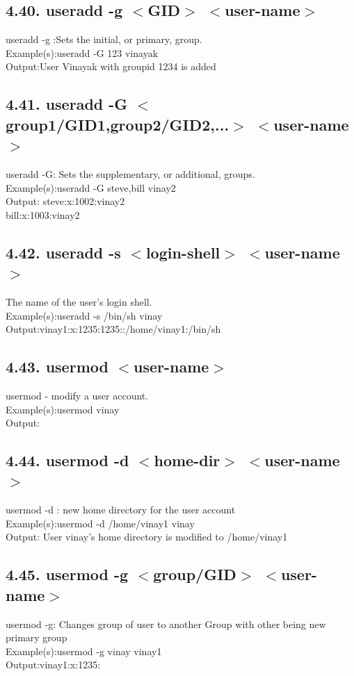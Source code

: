 \documentclass[11pt,a4]{article}
\begin{document}
\begin{enumerate}
\subsection*{4.40. useradd -g $<$GID$>$ $<$user-name$>$}
 useradd -g :Sets the initial, or primary, group.\\
 Example(s):useradd -G 123 vinayak\\
 Output:User Vinayak with groupid 1234 is added
\subsection*{4.41. useradd -G $<$group1/GID1,group2/GID2,...$>$ $<$user-name$>$}
useradd -G: Sets the supplementary, or additional, groups.\\
 Example(s):useradd -G steve,bill vinay2\\
Output: steve:x:1002:vinay2\\
bill:x:1003:vinay2



\subsection*{4.42. useradd -s $<$login-shell$>$ $<$user-name$>$}
The name of the user's login shell.\\
 Example(s):useradd -s /bin/sh vinay\\
Output:vinay1:x:1235:1235::/home/vinay1:/bin/sh
\subsection*{4.43. usermod $<$user-name$>$}
 usermod - modify a user account.\\
Example(s):usermod vinay\\
Output:
\subsection*{4.44. usermod -d $<$home-dir$>$ $<$user-name$>$}
usermod -d : new home directory for the user account\\
Example(s):usermod -d /home/vinay1 vinay\\
Output: User vinay's home directory is modified to /home/vinay1

\subsection*{4.45. usermod -g $<$group/GID$>$ $<$user-name$>$}
usermod -g: Changes group of user to another Group with other being  new primary group\\
Example(s):usermod -g vinay vinay1\\
Output:vinay1:x:1235:


\end{enumerate}
\end{document}
